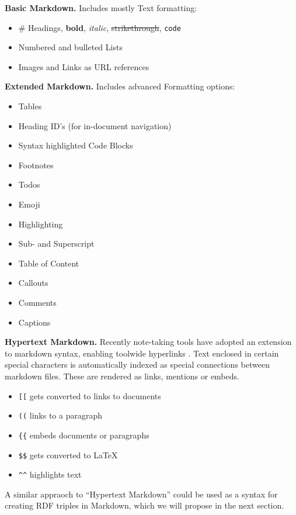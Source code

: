 \textbf{Basic Markdown.} Includes mostly Text formatting:
\begin{itemize}
    \item \# Headings, \textbf{bold}, \emph{italic}, \sout{strikethrough}, \verb|code|
    \item Numbered and bulleted Lists
    \item Images and Links as URL references
\end{itemize}
    
\textbf{Extended Markdown.} Includes advanced Formatting options:
\begin{itemize}
    \item Tables
    \item Heading ID’s (for in-document navigation)
    \item Syntax highlighted Code Blocks
    \item Footnotes
    \item Todos
    \item Emoji
    \item Highlighting
    \item Sub- and Superscript
    \item Table of Content
    \item Callouts
    \item Comments
    \item Captions
\end{itemize}
    
\textbf{Hypertext Markdown.} Recently note-taking tools have adopted an extension to markdown syntax, enabling toolwide hyperlinks \cite{notion, obsidian, roam,logseq}. Text enclosed in certain special characters is automatically indexed as special connections between markdown files. These are rendered as links, mentions or embeds.

\begin{itemize}
    \item \verb|[[| gets converted to links to documents
    \item \verb|((| links to a paragraph
    \item \verb|{{| embeds documents or paragraphs
    \item \verb|$$| gets converted to \LaTeX
    \item \verb|^^| highlights text
\end{itemize}
    
    

A similar appraoch to “Hypertext Markdown” could be used as a syntax for creating RDF triples in Markdown, which we will propose in the next section.

